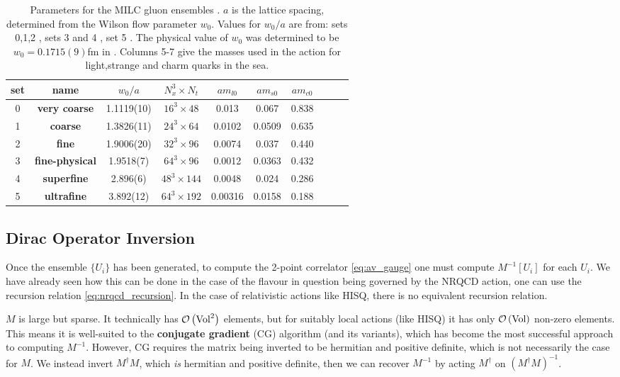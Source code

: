 \begin{table*}[t]
  \begin{center}
    \begin{tabular}{c c c c c c c c c c}
      \hline
      set & name & $w_0/a$  & $N_x^3\times N_t$ & $am_{l0}$ & $am_{s0}$ & $am_{c0}$  \\ [0.5ex]
      \hline
      0 & \bf{very coarse} & 1.1119(10) & $16^3\times48$ & 0.013 & 0.067 & 0.838 \\ [1ex]
      1 & \bf{coarse} & 1.3826(11) & $24^3\times64$ & 0.0102 & 0.0509 & 0.635 \\ [1ex]
      2 & \bf{fine} & 1.9006(20) & $32^3\times96$ & 0.0074 & 0.037 & 0.440 \\ [1ex]
      3 & \bf{fine-physical} & 1.9518(7) & $64^3\times96$ & 0.0012 & 0.0363 & 0.432 \\ [1ex]
      4 & \bf{superfine} & 2.896(6) & $48^3\times144$ & 0.0048 & 0.024 & 0.286 \\ [1ex]
      5 & \bf{ultrafine} & 3.892(12) &  $64^3\times192$ & 0.00316 & 0.0158 & 0.188  \\ [1ex]
      \hline
    \end{tabular}
  \end{center}
  \caption{Parameters for the MILC gluon ensembles \cite{Bazavov:2010ru,Bazavov:2012xda}. $a$ is the lattice spacing, determined from the Wilson flow parameter $w_0$. Values for $w_0/a$ are from: sets 0,1,2 \cite{Chakraborty:2016mwy}, sets 3 and 4 \cite{Chakraborty:2014aca}, set 5 \cite{mcneile:private}. The physical value of $w_0$ was determined to be $w_0=0.1715(9)$fm in \cite{Dowdall:2013rya}. Columns 5-7 give the masses used in the action for light,strange and charm quarks in the sea. \label{tab:ensembles}}
\end{table*}


\subsection{Dirac Operator Inversion}
\label{sec:inversions}

Once the ensemble $\{U_i\}$ has been generated, to compute the 2-point correlator \eqref{eq:av_gauge} one must compute $M^{-1}[U_i]$ for each $U_i$. We have already seen how this can be done in the case of the flavour in question being governed by the NRQCD action, one can use the recursion relation \eqref{eq:nrqcd_recursion}. In the case of relativistic actions like HISQ, there is no equivalent recursion relation.

$M$ is large but sparse. It technically has $\mathcal{O}\left( \text{Vol}^2 \right)$ elements, but for suitably local actions (like HISQ) it has only $\mathcal{O}\left( \text{Vol} \right)$ non-zero elements. This means it is well-suited to the {\bf{conjugate gradient}} (CG) algorithm \cite{Hestenes&Stiefel:1952} (and its variants), which has become the most successful approach to computing $M^{-1}$. However, CG requires the matrix being inverted to be hermitian and positive definite, which is not necessarily the case for $M$. We instead invert $M^{\dagger}M$, which {\it{is}} hermitian and positive definite, then we can recover $M^{-1}$ by acting $M^{\dagger}$ on $(M^{\dagger}M)^{-1}$.

